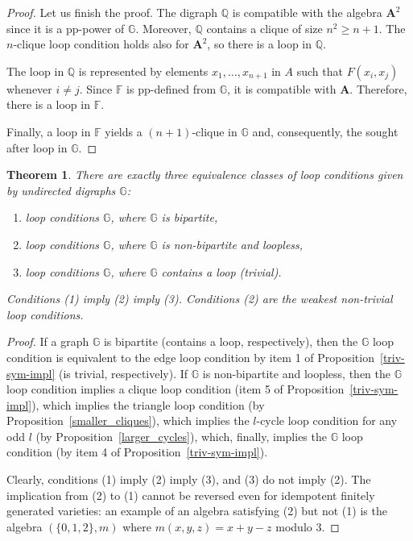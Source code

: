 \documentclass[a4paper]{article}
\newcommand{\alg}[1]{\mathbf{#1}}
\newcommand{\relstr}[1]{\mathbb{#1}}
\newtheorem{theorem}{Theorem}
\begin{document}
\begin{proof}
Let us finish the proof. The digraph $\relstr Q$ is compatible with the algebra
$\alg A^2$ since it is a pp-power of $\relstr G$. Moreover, $\relstr Q$
contains a clique of size $n^2\geq n+1$. The $n$-clique loop condition
holds also for $\alg A^2$, so there is a loop in $\relstr Q$.

The loop in $\relstr Q$ is represented by elements $x_1,\ldots,x_{n+1}$ in
$A$ such that $F(x_i,x_j)$ whenever $i\neq j$. Since $\relstr F$ is pp-defined
from $\relstr G$, it is compatible with $\alg A$. Therefore, there is
a loop in $\relstr F$.

Finally, a loop in $\relstr F$ yields a $(n+1)$-clique in $\relstr G$ and,
consequently, the sought after loop in $\relstr G$.
\end{proof}



\begin{theorem}
  \label{sym-class}
There are exactly three equivalence classes of loop conditions given by  undirected digraphs $\relstr G$: 
\begin{enumerate}
\item[(1)] loop conditions $\relstr G$, where $\relstr G$ is bipartite,
\item[(2)] loop conditions $\relstr G$, where $\relstr G$ is non-bipartite and loopless,
\item[(3)] loop conditions $\relstr G$, where $\relstr G$ contains a loop (trivial).
\end{enumerate}
Conditions (1) imply (2) imply (3).
Conditions (2) are the weakest non-trivial loop conditions.
\end{theorem}

\begin{proof}
If a graph $\relstr G$ is bipartite (contains a loop, respectively), then the $\relstr{G}$ loop condition is equivalent to the edge loop condition by item 1 of Proposition~\ref{triv-sym-impl} (is trivial, respectively). If $\relstr{G}$ is non-bipartite and loopless, then the $\relstr{G}$ loop condition implies a clique loop condition (item 5 of Proposition~\ref{triv-sym-impl}), which implies the triangle loop condition (by Proposition~\ref{smaller_cliques}), which  implies the $l$-cycle loop condition for any odd $l$ (by Proposition~\ref{larger_cycles}), which, finally, implies the $\relstr{G}$ loop condition (by item 4 of Proposition~\ref{triv-sym-impl}).

Clearly, conditions (1) imply (2) imply (3), and (3) do not imply (2). The implication from (2) to (1)  cannot be reversed even for idempotent finitely generated varieties: an example of an algebra satisfying (2) but not (1) is the algebra $(\{0,1,2\}, m)$ where $m(x,y,z)=x+y-z$ modulo 3.
\end{proof}
\end{document}
